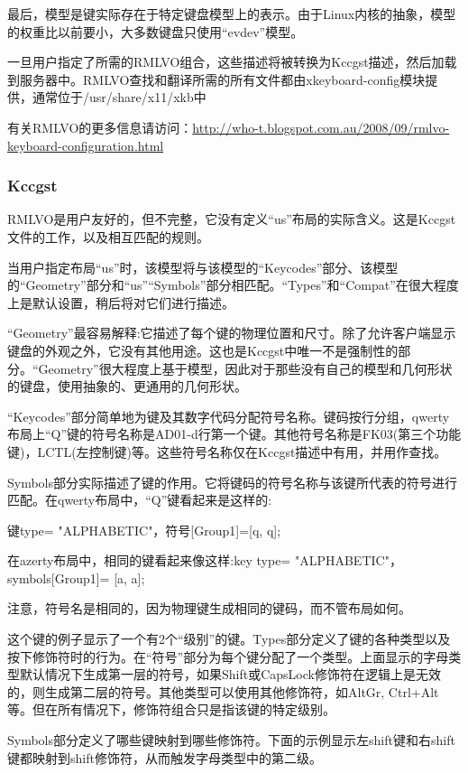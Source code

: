 最后，模型是键实际存在于特定键盘模型上的表示。由于Linux内核的抽象，模型的权重比以前要小，大多数键盘只使用“evdev”模型。

一旦用户指定了所需的RMLVO组合，这些描述将被转换为Kccgst描述，然后加载到服务器中。RMLVO查找和翻译所需的所有文件都由xkeyboard-config模块提供，通常位于/usr/share/x11/xkb中

有关RMLVO的更多信息请访问：\url{http://who-t.blogspot.com.au/2008/09/rmlvo-keyboard-configuration.html}

\subsubsection{Kccgst}

RMLVO是用户友好的，但不完整，它没有定义“us”布局的实际含义。这是Kccgst文件的工作，以及相互匹配的规则。

当用户指定布局“us”时，该模型将与该模型的“Keycodes”部分、该模型的“Geometry”部分和“us”“Symbols”部分相匹配。“Types”和“Compat”在很大程度上是默认设置，稍后将对它们进行描述。

“Geometry”最容易解释:它描述了每个键的物理位置和尺寸。除了允许客户端显示键盘的外观之外，它没有其他用途。这也是Kccgst中唯一不是强制性的部分。“Geometry”很大程度上基于模型，因此对于那些没有自己的模型和几何形状的键盘，使用抽象的、更通用的几何形状。

“Keycodes”部分简单地为键及其数字代码分配符号名称。键码按行分组，qwerty布局上“Q”键的符号名称是AD01-d行第一个键。其他符号名称是FK03(第三个功能键)，LCTL(左控制键)等。这些符号名称仅在Kccgst描述中有用，并用作查找。

Symbols部分实际描述了键的作用。它将键码的符号名称与该键所代表的符号进行匹配。在qwerty布局中，“Q”键看起来是这样的:

键{type= "ALPHABETIC"，符号[Group1]=[q, q]};

在azerty布局中，相同的键看起来像这样:key {type= "ALPHABETIC"， symbols[Group1]= [a, a]};

\begin{note}
注意，符号名是相同的，因为物理键生成相同的键码，而不管布局如何。
\end{note}

这个键的例子显示了一个有2个“级别”的键。Types部分定义了键的各种类型以及按下修饰符时的行为。在“符号”部分为每个键分配了一个类型。上面显示的字母类型默认情况下生成第一层的符号，如果Shift或CapsLock修饰符在逻辑上是无效的，则生成第二层的符号。其他类型可以使用其他修饰符，如AltGr, Ctrl+Alt等。但在所有情况下，修饰符组合只是指该键的特定级别。

Symbols部分定义了哪些键映射到哪些修饰符。下面的示例显示左shift键和右shift键都映射到shift修饰符，从而触发字母类型中的第二级。


